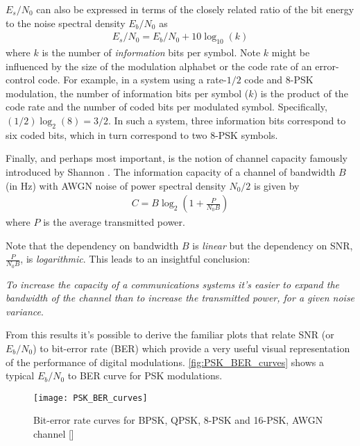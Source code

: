 $E_s/N_0$ can also be expressed in terms of the closely related ratio of the bit energy to the noise spectral density $E_b/N_0$ as
\begin{align}
  \label{eq:esn0}
  E_s/N_0 = E_b/N_0 + 10\log_{10}(k)
\end{align}
where $k$ is the number of \emph{information} bits per symbol. Note $k$ might be influenced by the size of the modulation alphabet or the code rate of an error-control code. For example, in a system using a rate-$1/2$ code and 8-PSK modulation, the number of information bits per symbol ($k$) is the product of the code rate and the number of coded bits per modulated symbol. Specifically, $(1/2) \log_2(8) = 3/2$. In such a system, three information bits correspond to six coded bits, which in turn correspond to two 8-PSK symbols.

Finally, and perhaps most important, is the notion of channel capacity famously introduced by Shannon \cite{shannon_capacity}. The information capacity of a channel of bandwidth $B$ (in Hz) with AWGN noise of power spectral density $N_0/2$ is given by
\begin{align}
  C = B\log_{2}\left(1+\frac{P}{N_0 B}\right)
\end{align}
where $P$ is the average transmitted power.

Note that the dependency on bandwidth $B$ is \emph{linear} but the dependency on SNR, $\frac{P}{N_0 B}$, is \emph{logarithmic}. This leads to an insightful conclusion:

\begin{displayquote}
  \emph{To increase the capacity of a communications systems it's easier to expand the bandwidth of the channel than to increase the transmitted power, for a given noise variance}.
\end{displayquote}

From this results it's possible to derive the familiar plots that relate SNR (or $E_b/N_0$) to bit-error rate (BER) which provide a very useful visual representation of the performance of digital modulations. \autoref{fig:PSK_BER_curves} shows a typical $E_b/N_0$ to BER curve for PSK modulations.

\begin{figure}[ht]
  \centering
  \texttt{[image: PSK\_BER\_curves]}
  \caption{Bit-error rate curves for BPSK, QPSK, 8-PSK and 16-PSK, AWGN channel [\citeauthor{image:ber_curve}]}
  \label{fig:PSK_BER_curves}
\end{figure}

